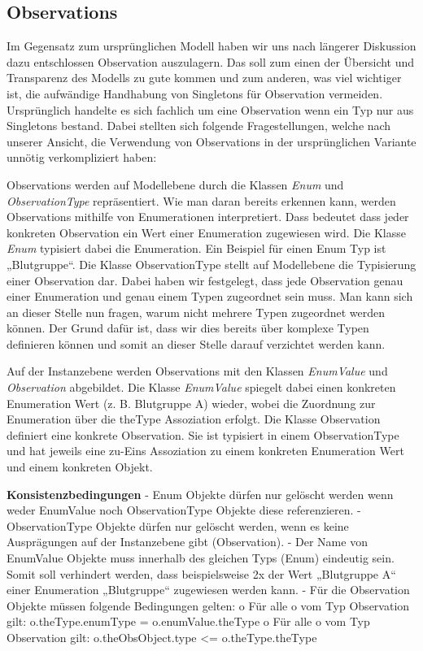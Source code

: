\subsection{Observations}\label{Observations}
Im Gegensatz zum ursprünglichen Modell haben wir uns nach längerer Diskussion dazu entschlossen Observation auszulagern. 
Das soll zum einen der Übersicht und Transparenz des Modells zu gute kommen und zum anderen, was viel wichtiger ist, 
die aufwändige Handhabung von Singletons für Observation vermeiden. 
Ursprünglich handelte es sich fachlich um eine Observation wenn ein Typ nur aus Singletons bestand. 
Dabei stellten sich folgende Fragestellungen, welche nach unserer Ansicht, 
die Verwendung von Observations in der ursprünglichen Variante unnötig verkompliziert haben:


Observations werden auf Modellebene durch die Klassen \emph{Enum} und \emph{ObservationType} repräsentiert. 
Wie man daran bereits erkennen kann, werden Observations mithilfe von Enumerationen interpretiert. 
Dass bedeutet dass jeder konkreten Observation ein Wert einer Enumeration zugewiesen wird. 
Die Klasse \emph{Enum} typisiert dabei die Enumeration. 
Ein Beispiel für einen Enum Typ ist „Blutgruppe“. Die Klasse ObservationType stellt auf Modellebene die 
Typisierung einer Observation dar. Dabei haben wir festgelegt, dass jede Observation genau einer Enumeration 
und genau einem Typen zugeordnet sein muss. Man kann sich an dieser Stelle nun fragen, warum nicht mehrere Typen 
zugeordnet werden können. Der Grund dafür ist, dass wir dies bereits über komplexe Typen definieren können und somit 
an dieser Stelle darauf verzichtet werden kann.


Auf der Instanzebene werden Observations mit den Klassen \emph{EnumValue} und \emph{Observation} abgebildet. 
Die Klasse \emph{EnumValue} spiegelt dabei einen konkreten Enumeration Wert (z. B. Blutgruppe A) wieder, 
wobei die Zuordnung zur Enumeration über die theType Assoziation erfolgt. 
Die Klasse Observation definiert eine konkrete Observation. 
Sie ist typisiert in einem ObservationType und hat jeweils eine zu-Eins Assoziation zu einem konkreten Enumeration Wert 
und einem konkreten Objekt.

\textbf{Konsistenzbedingungen} \newline
-	Enum Objekte dürfen nur gelöscht werden wenn weder EnumValue noch ObservationType Objekte diese referenzieren.
-	ObservationType Objekte dürfen nur gelöscht werden, wenn es keine Ausprägungen auf der Instanzebene gibt (Observation).
-	Der Name von EnumValue Objekte muss innerhalb des gleichen Typs (Enum) eindeutig sein. Somit soll verhindert werden, dass beispielsweise 2x der Wert „Blutgruppe A“ einer Enumeration „Blutgruppe“ zugewiesen werden kann.
-	Für die Observation Objekte müssen folgende Bedingungen gelten:
o	Für alle o vom Typ Observation gilt:
o.theType.enumType = o.enumValue.theType
o	Für alle o vom Typ Observation gilt:
o.theObsObject.type <= o.theType.theType

